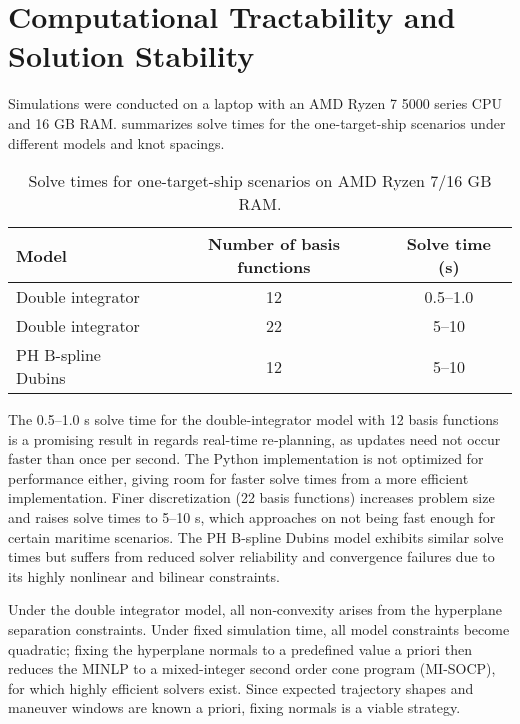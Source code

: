 \section{Computational Tractability and Solution Stability}\label{sec:stability-and-tractability}

Simulations were conducted on a laptop with an AMD Ryzen 7 5000 series CPU and 16 GB RAM.  summarizes solve times for the one-target-ship scenarios under different models and knot spacings.

\begin{table}[htbp]
    \centering
    \small
    \begin{tabular}{|l|c|c|}
    \hline
    \textbf{Model} & \textbf{Number of basis functions} & \textbf{Solve time (s)} \\
    \hline
    Double integrator       & 12  & 0.5–1.0    \\
    Double integrator       & 22  & 5–10       \\
    PH B-spline Dubins      & 12  & 5–10       \\
    \hline
    \end{tabular}
    \caption{Solve times for one-target-ship scenarios on AMD Ryzen 7/16 GB RAM.}
    \label{tab:solve-times}
\end{table}

The 0.5–1.0 s solve time for the double-integrator model with 12 basis functions is a promising result in regards real-time re‐planning, as updates need not occur faster than once per second. The Python implementation is not optimized for performance either, giving room for faster solve times from a more efficient implementation. Finer discretization (22 basis functions) increases problem size and raises solve times to 5–10 s, which approaches on not being fast enough for certain maritime scenarios. The PH B-spline Dubins model exhibits similar solve times but suffers from reduced solver reliability and convergence failures due to its highly nonlinear and bilinear constraints.

Under the double integrator model, all non‐convexity arises from the hyperplane separation constraints. Under fixed simulation time, all model constraints become quadratic; fixing the hyperplane normals to a predefined value a priori then reduces the MINLP to a mixed-integer second order cone program (MI-SOCP), for which highly efficient solvers exist. Since expected trajectory shapes and maneuver windows are known a priori, fixing normals is a viable strategy.

